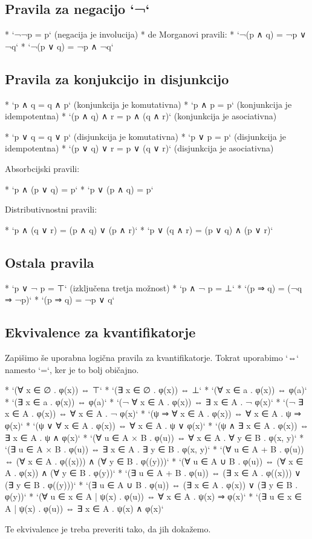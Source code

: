 \subsection{Pravila za negacijo `¬`}

* `¬¬p = p` (negacija je involucija)
* de Morganovi pravili:
    * `¬(p ∧ q) = ¬p ∨ ¬q`
    * `¬(p ∨ q) = ¬p ∧ ¬q`

\subsection{Pravila za konjukcijo in disjunkcijo}

* `p ∧ q = q ∧ p` (konjunkcija je komutativna)
* `p ∧ p = p` (konjunkcija je idempotentna)
* `(p ∧ q) ∧ r = p ∧ (q ∧ r)` (konjunkcija je asociativna)

* `p ∨ q = q ∨ p` (disjunkcija je komutativna)
* `p ∨ p = p` (disjunkcija je idempotentna)
* `(p ∨ q) ∨ r = p ∨ (q ∨ r)` (disjunkcija je asociativna)

Absorbcijski pravili:

* `p ∧ (p ∨ q) = p`
* `p ∨ (p ∧ q) = p`

Distributivnostni pravili:

* `p ∧ (q ∨ r) = (p ∧ q) ∨ (p ∧ r)`
* `p ∨ (q ∧ r) = (p ∨ q) ∧ (p ∨ r)`

\subsection{Ostala pravila}

* `p ∨ ¬ p = ⊤` (izključena tretja možnost)
* `p ∧ ¬ p = ⊥`
* `(p ⇒ q) = (¬q ⇒ ¬p)`
* `(p ⇒ q) = ¬p ∨ q`

\subsection{Ekvivalence za kvantifikatorje}

Zapišimo še uporabna logična pravila za kvantifikatorje. Tokrat uporabimo `⇔`
namesto `=`, ker je to bolj običajno.

* `(∀ x ∈ ∅ . φ(x)) ⇔ ⊤`
* `(∃ x ∈ ∅ . φ(x)) ⇔ ⊥`
* `(∀ x ∈ {a} . φ(x)) ⇔ φ(a)`
* `(∃ x ∈ {a} . φ(x)) ⇔ φ(a)`
* `(¬ ∀ x ∈ A . φ(x)) ⇔ ∃ x ∈ A . ¬ φ(x)`
* `(¬ ∃ x ∈ A . φ(x)) ⇔ ∀ x ∈ A . ¬ φ(x)`
* `(ψ ⇒ ∀ x ∈ A . φ(x)) ⇔ ∀ x ∈ A . ψ ⇒ φ(x)`
* `(ψ ∨ ∀ x ∈ A . φ(x)) ⇔ ∀ x ∈ A . ψ ∨ φ(x)`
* `(ψ ∧ ∃ x ∈ A . φ(x)) ⇔ ∃ x ∈ A . ψ ∧ φ(x)`
* `(∀ u ∈ A × B . φ(u)) ⇔ ∀ x ∈ A . ∀ y ∈ B . φ(x, y)`
* `(∃ u ∈ A × B . φ(u)) ⇔ ∃ x ∈ A . ∃ y ∈ B . φ(x, y)`
* `(∀ u ∈ A + B . φ(u)) ⇔ (∀ x ∈ A . φ(\inl(x))) ∧ (∀ y ∈ B . φ(\inr(y)))`
* `(∀ u ∈ A ∪ B . φ(u)) ⇔ (∀ x ∈ A . φ(x)) ∧ (∀ y ∈ B . φ(y))`
* `(∃ u ∈ A + B . φ(u)) ⇔ (∃ x ∈ A . φ(\inl(x))) ∨ (∃ y ∈ B . φ(\inr(y)))`
* `(∃ u ∈ A ∪ B . φ(u)) ⇔ (∃ x ∈ A . φ(x)) ∨ (∃ y ∈ B . φ(y))`
* `(∀ u ∈ {x ∈ A | ψ(x)} . φ(u)) ⇔ ∀ x ∈ A . ψ(x) ⇒ φ(x)`
* `(∃ u ∈ {x ∈ A | ψ(x)} . φ(u)) ⇔ ∃ x ∈ A . ψ(x) ∧ φ(x)`

Te ekvivalence je treba preveriti tako, da jih dokažemo.
